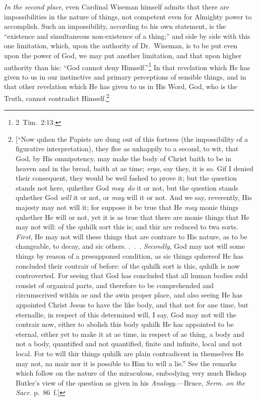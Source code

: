 \documentclass[
]{book}
\begin{document}
\emph{In the second place}, even Cardinal Wiseman himself admits that there are impossibilities in the nature of things, not competent even for Almighty power to accomplish. Such an impossibility, according to his own statement, is the ``existence and simultaneous non-existence of a thing;'' and side by side with this one limitation, which, upon the authority of Dr.~Wiseman, is to be put even upon the power of God, we may put another limitation, and that upon higher authority than his: ``God cannot deny Himself.''\footnote{2~Tim.~2:13.} In that revelation which He has given to us in our instinctive and primary perceptions of sensible things, and in that other revelation which He has given to us in His Word, God, who is the Truth, cannot contradict Himself.\footnote{{[}``Now quhen the Papists are dung out of this fortress (the impossibility of a figurative interpretation), they flee as unhappily to a second, to wit, that God, by His omnipotency, may make the body of Christ baith to be in heaven and in the bread, baith at ae time; \emph{ergo}, say they, it is so. Gif I denied their consequent, they would be weil fashed to prove it; but the question stands not here, quhether God \emph{may~do} it or not, but the question stands quhether God \emph{will} it or not, or \emph{may} will it or not. And we say, reverently, His majesty may not will it; for suppose it be true that He \emph{may} monie things quhether He will or not, yet it is as true that there are monie things that He may not will: of the quhilk sort this is; and thir are reduced to twa sorts. \emph{First}, He may not will these things that are contrare to His nature, as to be changeable, to decay, and sic others. .~.~. \emph{Secondly}, God may not will some things by reason of a presupponed condition, as sic things quhereof He has concluded their coutrair of before: of the quhilk sort is this, quhilk is now controverted. For seeing that God has concluded that all human bodies suld consist of organical parts, and therefore to be comprehended and circumscrived within ae and the awin proper place, and also seeing He has appointed Christ Jesus to have the like body, and that not for ane time, but eternallie, in respect of this determined will, I say, God may not will the contrair now, either to abolish this body quhilk He has appointed to be eternal, either yet to make it at ae time, in respect of ae thing, a body and not a body, quantified and not quantified, finite and infinite, local and not local. For to will thir things quhilk are plain contradicent in themselves He may not, na mair nor it is possible to Him to will a lie.'' See the remarks which follow on the nature of the miraculous, embodying very much Bishop Butler's view of the question as given in his \emph{Analogy}.---Bruce, \emph{Serm. on the Sacr.} p.~86~f.{]}}
\end{document}
